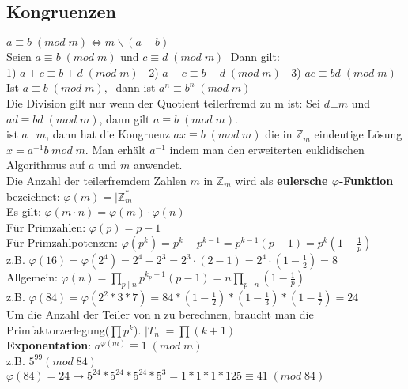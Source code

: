 \documentclass[11pt]{article}
\begin{document}
\subsection{Kongruenzen}
$a \equiv b \; (mod\; m) \Longleftrightarrow m \backslash (a-b)$\\
Seien $a \equiv b \; (mod\; m)$ und $c \equiv d \; (mod\; m)\; $ Dann gilt:\\
1) $a+c \equiv b+d \; (mod\; m)\; \;$ 2) $a-c \equiv b-d \; (mod\; m)\; \;$ 3) $ac \equiv bd \; (mod\; m)\; \;$\\
Ist $a \equiv b \; (mod\; m),\; $ dann ist $a^n \equiv b^n \; (mod\; m)$\\
Die Division gilt nur wenn der Quotient teilerfremd zu m ist: Sei $d \bot m$ und $ad \equiv bd \; (mod\; m)$, dann gilt $a \equiv b \; (mod\; m)$.\\
ist $a \bot m$, dann hat die Kongruenz $ax \equiv b\; (mod\; m)$ die in $\mathbb{Z}_m$ eindeutige L{\"o}sung $x=a^{-1}b\; mod\;m$. Man erh{\"a}lt $a^{-1}$ indem man den erweiterten euklidischen Algorithmus auf $a$ und $m$ anwendet.\\
Die Anzahl der teilerfremdem Zahlen $m$ in $\mathbb{Z}_m$ wird als {\bfseries eulersche $\varphi$-Funktion} bezeichnet: $\varphi (m) = \mathopen| \mathbb{Z}^{*}_m \mathclose| $\\ Es gilt: $
    \varphi (m \cdot n) = \varphi (m) \cdot \varphi (n) $\\
F{\"u}r Primzahlen: $\varphi(p) = p-1$\\
F{\"u}r Primzahlpotenzen: $\varphi(p^k) = p^k-p^{k-1} = p^{k-1}(p-1)= p^{k}\left(1-\frac1{p}\right)$\\ z.B. $\varphi(16)=\varphi(2^4)=2^4-2^3=2^3\cdot (2-1)=2^4\cdot \left(1-\frac12\right) =8 $\\
Allgemein: $\varphi(n) = \prod_{p\mid n} p^{k_p-1}(p-1) = n \prod_{p\mid n}\left(1-\frac{1}{p}\right) $\\
z.B. $\varphi (84) = \varphi (2^2*3*7)=84*(1-\frac{1}{2})*(1-\frac{1}{3})*(1-\frac{1}{7})=24$\\
Um die Anzahl der Teiler von n zu berechnen, braucht man die Primfaktorzerlegung($\prod {p^k}$). $\mathopen| T_n \mathclose| = \prod{(k+1)}$\\
{\bfseries Exponentation}: $a^{\varphi (m)} \equiv 1\;(mod\;m)$\\
z.B. $5^{99} (mod\;84)\;$\hspace{3mm}$ \varphi (84) = 24 \longrightarrow 5^{24}*5^{24}*5^{24}*5^3 = 1*1*1*125 \equiv 41\; (mod\; 84)$
\end{document}
